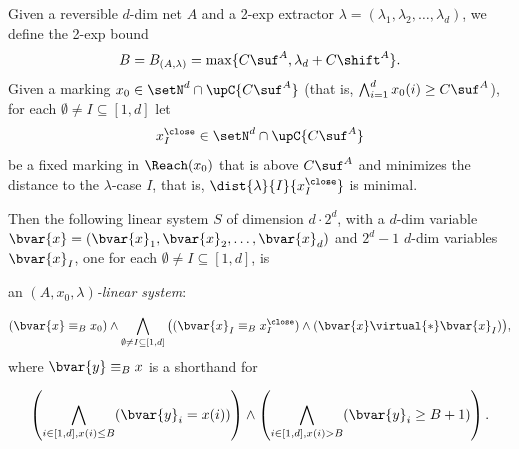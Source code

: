\begin{defi}\label{def:crucialLS}
Given a reversible $d$-dim net $A$ and a 2-exp extractor
	$\lambda=(\lambda_1,\lambda_2,\dots,\lambda_d)$,
	we define
the 2-exp bound	\begin{equation}\label{eq:BAffnets}
	B=B_{(A,\lambda)}=\max\{C\suf^A,\lambda_d+C\shift^A\}.
	\end{equation}
	Given a marking $x_0\in\setN^d\cap\upC{C\suf^A}$ (that is, 
	$\bigwedge_{i=1}^d x_0(i)\geq C\suf^A$), for each $\emptyset\neq I\subseteq[1,d]$ let 
	\[x^\close_I\in \setN^d\cap\upC{C\suf^A}\]
	be a fixed marking in $\Reach(x_0)$
	that is above $C\suf^A$ and minimizes the distance to
	the $\lambda$-case $I$, that is, $\dist{\lambda}{I}{x^\close_I}$ is
	minimal. 

Then the following 
linear system $S$ of dimension $d\cdot 2^d$, with
	a $d$-dim variable
	$\bvar{x}=(\bvar{x}_1,\bvar{x}_2,\dots,\bvar{x}_d)$ and $2^d-1$ $d$-dim variables 
	$\bvar{x}_I$, one for each $\emptyset\neq I\subseteq[1,d]$,
	is 
	\begin{center}
		an \emph{$(A,x_0,\lambda)$-linear system}:
	\end{center}		
\begin{equation}\label{eq:AxLS}
	(\bvar{x}\equiv_B x_0)
	\land
	\bigwedge_{\emptyset\neq I\subseteq[1,d]}\big((\bvar{x}_I\equiv_B x^\close_I)\land
	(\bvar{x}\virtual{*}\bvar{x}_I)\big),
\end{equation}
	where $\bvar{y}\equiv_B x$ is a shorthand for 

	\[\left(\bigwedge_{i\in[1,d], x(i)\leq B}
	(\bvar{y}_i=x(i))\right)\land 
	\left(\bigwedge_{i\in[1,d], x(i)> B} (\bvar{y}_i\geq
	B+1)\right).\]
\end{defi}	

